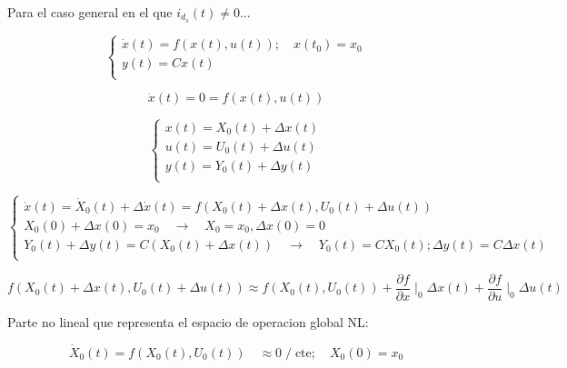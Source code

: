 \documentclass{article}
\begin{document}
Para el caso general en el que ${i}_{d_{s}}(t) \neq 0$... 

\begin{equation}
    \begin{cases}
        \dot{x}(t) = f(x(t),u(t));  \quad   x(t_{0}) = x_{0}\\
        y(t) = Cx(t)\\
    \end{cases}
\end{equation}


\begin{equation}
    \dot{x}(t) = 0 = f(x(t),u(t))
\end{equation}


\begin{equation}
    \begin{cases}
        x(t) = X_{0}(t) + \Delta x(t)\\
        u(t) = U_{0}(t) + \Delta u(t)\\
        y(t) = Y_{0}(t) + \Delta y(t)\\
    \end{cases}
\end{equation}


\begin{equation}
    \begin{cases}
        \dot{x}(t) = \dot{X}_{0}(t) + \Delta\dot{x}(t) = f(X_{0}(t) + \Delta x(t), U_{0}(t) + \Delta u(t))\\
        X_{0}(0) + \Delta x(0) = x_{0} \quad\rightarrow\quad X_{0} = x_{0}, \Delta x(0) = 0 \\
        Y_{0}(t) + \Delta y(t) = C(X_{0}(t) + \Delta x(t)) \quad\rightarrow\quad Y_{0}(t) = C X_{0}(t); \Delta y(t) = C \Delta x(t)\\
    \end{cases}
\end{equation}


\begin{equation}
    f(X_{0}(t) + \Delta x(t), U_{0}(t) + \Delta u (t)) \approx f(X_{0}(t), U_{0}(t)) + \frac{\partial f}{\partial x}\mid_{0}\Delta x(t) + \frac{\partial f}{\partial u}\mid_{0}\Delta u(t)
\end{equation}

Parte no lineal que representa el espacio de operacion global NL:

\begin{equation}
    \dot{X}_{0}(t) = f(X_{0}(t), U_{0}(t)) \quad \approx 0 \;/\; \text{cte}; \quad X_{0}(0) = x_{0}
\end{equation}
\end{document}
